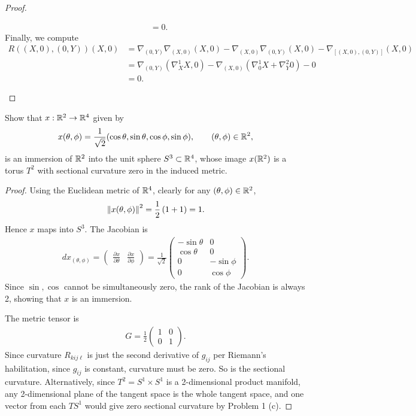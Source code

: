 \documentclass[12pt]{article}
\begin{document}
\begin{proof}
\begin{enumerate}[label=(\alph*)]
\begin{align*}
	&= 0 .
\end{align*}
Finally, we compute
	\begin{align*}
		R((X,0),(0,Y))(X,0) &= \nabla_{(0,Y)} \nabla_{(X,0)} (X,0) - \nabla_{(X,0)} \nabla_{(0,Y)} (X,0)  - \nabla_{[(X,0),(0,Y)]} (X,0)  \\
		&= \nabla_{(0,Y)} (\nabla_X^1 X,0)  - \nabla_{(X,0)} \left( \nabla_0^{1} X + \nabla_Y^{2} 0 \right)  - 0  \\
		&= 0 .
	\end{align*}
\end{enumerate}
\end{proof}

\begin{problem}[6.2]
Show that $ x: \mathbb{R}^2 \to \mathbb{R}^{4}$ given by
\begin{align*}
	x(\theta,\phi) = \frac{1}{\sqrt{2} } (\cos \theta, \sin \theta, \cos \phi, \sin \phi), \qquad (\theta,\phi) \in \mathbb{R}^2,
\end{align*}
is an immersion of $ \mathbb{R}^2$ into the unit sphere $ S^3 \subset \mathbb{R}^{4}$, whose image $ x(\mathbb{R}^2)$ is a torus $ T^2$ with sectional curvature zero in the induced metric.
\end{problem}
\begin{proof}
Using the Euclidean metric of $ \mathbb{R}^{4}$, clearly for any $ (\theta,\phi) \in \mathbb{R}^2$,
\begin{align*}
	{\left\lVert{ x(\theta,\phi)}\right\rVert}^2 = \frac{1}{2} \left( 1+1 \right)  = 1 . 
\end{align*}
Hence $ x $ maps into $ S^3$. The Jacobian is
\begin{align*}
	dx_{(\theta,\phi)} = \begin{pmatrix} \frac{\partial x}{\partial \theta} & \frac{\partial x}{\partial \phi}   \end{pmatrix} = \frac{1}{\sqrt{2} } \begin{pmatrix} -\sin \theta&0\\ \cos \theta &0\\0& -\sin \phi\\ 0 & \cos \phi \end{pmatrix} .
\end{align*}
Since $ \sin , \cos$ cannot be simultaneously zero, the rank of the Jacobian is always 2, showing that $ x$ is an immersion.

The metric tensor is 
\begin{align*}
	G = \frac{1}{2} \begin{pmatrix} 1&0\\0&1 \end{pmatrix} .
\end{align*}
Since curvature $ R_{kij\ell}$ is just the second derivative of $ g_{ij}$ per Riemann's habilitation, since $ g_{ij}$ is constant, curvature must be zero. So is the sectional curvature. Alternatively, since $ T^2 = S^{1} \times S^{1}$ is a 2-dimensional product manifold, any 2-dimensional plane of the tangent space is the whole tangent space, and one vector from each $ TS^{1}$ would give zero sectional curvature by Problem 1 (c).
\end{proof}
\end{document}
